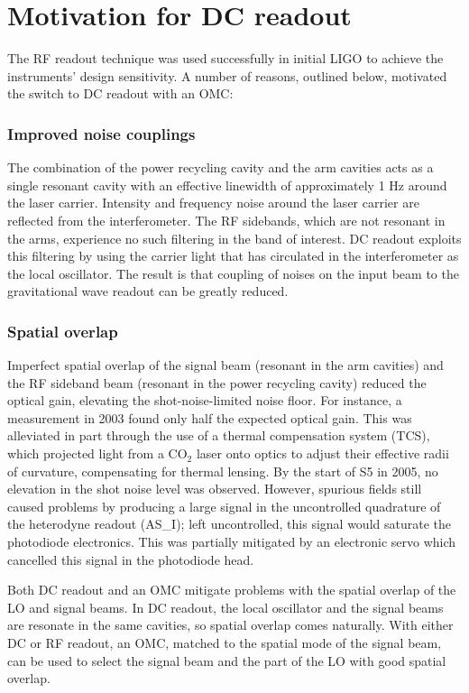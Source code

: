 \section{Motivation for DC readout}

The RF readout technique was used successfully in initial LIGO to
achieve the instruments' design sensitivity.  A number of reasons,
outlined below, motivated the switch to DC readout with an OMC:

\subsubsection*{Improved noise couplings} 
The combination of the power recycling cavity and the arm cavities
acts as a single resonant cavity with an effective linewidth of
approximately 1 Hz around the laser carrier.  Intensity and frequency
noise around the laser carrier are reflected from the
interferometer.  The RF sidebands, which are not resonant in the arms,
experience no such filtering in the band of interest.  DC readout
exploits this filtering by using the carrier light that has circulated
in the interferometer as the local oscillator.  The result is that
coupling of noises on the input beam to the gravitational wave readout
can be greatly reduced.

\subsubsection*{Spatial overlap}  
Imperfect spatial overlap of the signal beam (resonant in the arm
cavities) and the RF sideband beam (resonant in the power recycling
cavity) reduced the optical gain, elevating the shot-noise-limited
noise floor. For instance, a measurement in 2003 found only half the
expected optical gain\cite{Fritschel2003Shot}.  This was alleviated in
part through the use of a thermal compensation system (TCS), which
projected light from a CO$_2$ laser onto optics to adjust their
effective radii of curvature, compensating for thermal lensing.  By
the start of S5 in 2005, no elevation in the shot noise level was
observed\cite{Ballmer2006LIGO}.  However, spurious fields still caused
problems by producing a large signal in the uncontrolled quadrature of
the heterodyne readout (AS\_I); left uncontrolled, this signal would
saturate the photodiode electronics.  This was partially mitigated by
an electronic servo which cancelled this signal in the photodiode
head.

Both DC readout and an OMC mitigate problems with the spatial overlap
of the LO and signal beams.  In DC readout, the local oscillator and
the signal beams are resonate in the same cavities, so spatial overlap
comes naturally.  With either DC or RF readout, an OMC, matched to the
spatial mode of the signal beam, can be used to select the signal beam
and the part of the LO with good spatial overlap.


